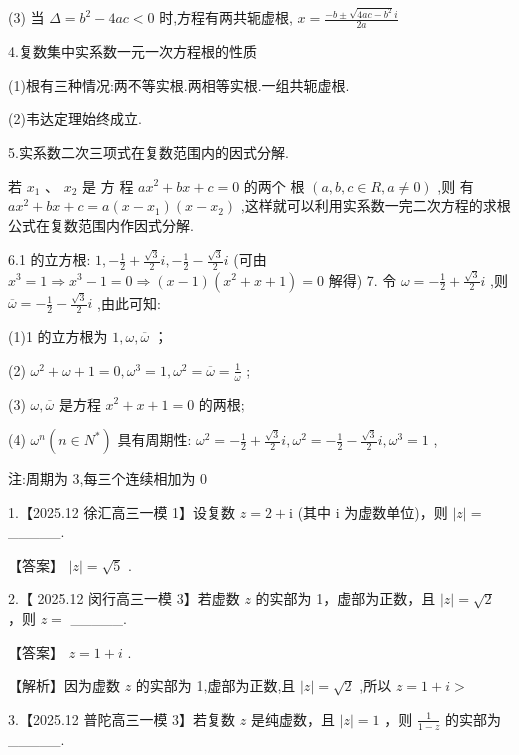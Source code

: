\documentclass[10pt]{article}
\begin{document}
(3) 当 \(\Delta  = {b}^{2} - {4ac} < 0\) 时,方程有两共轭虚根, \(x = \frac{-b \pm  \sqrt{{4ac} - {b}^{2}}i}{2a}\)

4.复数集中实系数一元一次方程根的性质

(1)根有三种情况:两不等实根.两相等实根.一组共轭虚根.

(2)韦达定理始终成立.

5.实系数二次三项式在复数范围内的因式分解.

若 \({x}_{1}\text{ 、 }{x}_{2}\) 是 方 程 \(a{x}^{2} + {bx} + c = 0\) 的两个 根 \(\left( {a,b,c \in  R,a \neq  0}\right)\) ,则 有 \(a{x}^{2} + {bx} + c = a\left( {x - {x}_{1}}\right) \left( {x - {x}_{2}}\right)\) ,这样就可以利用实系数一完二次方程的求根公式在复数范围内作因式分解.

6.1 的立方根: \(1, - \frac{1}{2} + \frac{\sqrt{3}}{2}i, - \frac{1}{2} - \frac{\sqrt{3}}{2}i\) (可由 \({x}^{3} = 1 \Rightarrow  {x}^{3} - 1 = 0 \Rightarrow  \left( {x - 1}\right) \left( {{x}^{2} + x + 1}\right)  = 0\) 解得) 7. 令 \(\omega  =  - \frac{1}{2} + \frac{\sqrt{3}}{2}i\) ,则 \(\overline{\omega } =  - \frac{1}{2} - \frac{\sqrt{3}}{2}i\) ,由此可知:

(1)1 的立方根为 \(1,\omega ,\overline{\omega }\) ；

(2) \({\omega }^{2} + \omega  + 1 = 0,{\omega }^{3} = 1,{\omega }^{2} = \overline{\omega } = \frac{1}{\omega }\) ;

(3) \(\omega ,\overline{\omega }\) 是方程 \({x}^{2} + x + 1 = 0\) 的两根;

(4) \({\omega }^{n}\left( {n \in  {N}^{ * }}\right)\) 具有周期性: \({\omega }^{2} =  - \frac{1}{2} + \frac{\sqrt{3}}{2}i,{\omega }^{2} =  - \frac{1}{2} - \frac{\sqrt{3}}{2}i,{\omega }^{3} = 1\) ,

注:周期为 3,每三个连续相加为 0

1.【2025.12 徐汇高三一模 1】设复数 \(z = 2 + \mathrm{i}\) (其中 \(\mathrm{i}\) 为虚数单位)，则 \(\left| z\right|  =\) \_\_\_\_\_.

【答案】 \(\left| z\right|  = \sqrt{5}\) .

2.【 2025.12 闵行高三一模 3】若虚数 \(z\) 的实部为 1，虚部为正数，且 \(\left| z\right|  = \sqrt{2}\) ，则 \(z =\) \_\_\_\_\_.

【答案】 \(z = 1 + i\) .

【解析】因为虚数 \(z\) 的实部为 1,虚部为正数,且 \(\left| z\right|  = \sqrt{2}\) ,所以 \(z = 1 + i >\)

3.【2025.12 普陀高三一模 3】若复数 \(z\) 是纯虚数，且 \(\left| z\right|  = 1\) ，则 \(\frac{1}{1 - z}\) 的实部为\_\_\_\_\_.
\end{document}
